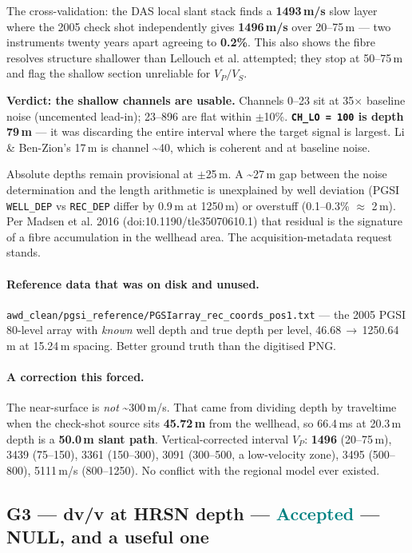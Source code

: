 \documentclass[11pt]{article}
\newcommand{\accepted}{\textcolor{teal}{\textbf{Accepted}}}
\begin{document}
The cross-validation: the DAS local slant stack finds a \textbf{1493\,m/s} slow
layer where the 2005 check shot independently gives \textbf{1496\,m/s} over
20--75\,m --- two instruments twenty years apart agreeing to \textbf{0.2\%}. This
also shows the fibre resolves structure shallower than Lellouch et al. attempted;
they stop at 50--75\,m and flag the shallow section unreliable for $V_P/V_S$.

\textbf{Verdict: the shallow channels are usable.} Channels 0--23 sit at 35$\times$
baseline noise (uncemented lead-in); 23--896 are flat within $\pm$10\%.
\textbf{\texttt{CH\_LO = 100} is depth 79\,m} --- it was discarding the entire
interval where the target signal is largest. Li \& Ben-Zion's 17\,m is channel
\textasciitilde40, which is coherent and at baseline noise.

Absolute depths remain provisional at $\pm$25\,m. A \textasciitilde27\,m gap between
the noise determination and the length arithmetic is unexplained by well deviation
(PGSI \texttt{WELL\_DEP} vs \texttt{REC\_DEP} differ by 0.9\,m at 1250\,m) or
overstuff (0.1--0.3\% $\approx$ 2\,m). Per Madsen et al. 2016
(doi:10.1190/tle35070610.1) that residual is the signature of a fibre accumulation
in the wellhead area. The acquisition-metadata request stands.

\paragraph{Reference data that was on disk and unused.}
\texttt{awd\_clean/pgsi\_reference/PGSIarray\_rec\_coords\_pos1.txt} --- the 2005
PGSI 80-level array with \emph{known} well depth and true depth per level,
46.68\,$\rightarrow$\,1250.64\,m at 15.24\,m spacing. Better ground truth than the
digitised PNG.

\paragraph{A correction this forced.} The near-surface is \emph{not}
\textasciitilde300\,m/s. That came from dividing depth by traveltime when the
check-shot source sits \textbf{45.72\,m} from the wellhead, so 66.4\,ms at 20.3\,m
depth is a \textbf{50.0\,m slant path}. Vertical-corrected interval $V_P$:
\textbf{1496} (20--75\,m), 3439 (75--150), 3361 (150--300), 3091 (300--500, a
low-velocity zone), 3495 (500--800), 5111\,m/s (800--1250). No conflict with the
regional model ever existed.

\subsection{G3 --- dv/v at HRSN depth --- \accepted{} --- NULL, and a useful one}
\end{document}
